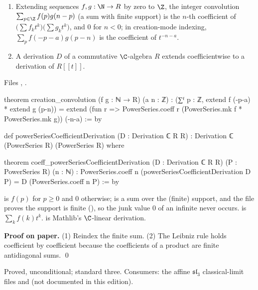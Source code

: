 \begin{theorem}\label{l11:thm:jetconv}
\begin{enumerate}
\item Extending sequences $f,g:\N\to R$ by zero to $\Z$, the integer convolution $\sum_{p\in\Z}f(p)g(n-p)$ (a sum with
  finite support) is the $n$-th coefficient of $\bigl(\sum f_kt^k\bigr)\bigl(\sum g_kt^k\bigr)$, and $0$ for $n<0$; in
  creation-mode indexing, $\sum_pf(-p-a)g(p-n)$ is the coefficient of $t^{-n-a}$.
\item A derivation $D$ of a commutative $\C$-algebra $R$ extends coefficientwise to a derivation of $R[[t]]$.
\end{enumerate}
\end{theorem}
\noindent Files ,
.
\begin{leancode}
theorem creation_convolution (f g : ℕ → R) (a n : ℤ) :
    (∑ᶠ p : ℤ, extend f (-p-a) * extend g (p-n)) =
      extend (fun r => PowerSeries.coeff r (PowerSeries.mk f * PowerSeries.mk g)) (-n-a) := by

def powerSeriesCoefficientDerivation (D : Derivation ℂ R R) :
    Derivation ℂ (PowerSeries R) (PowerSeries R) where

theorem coeff_powerSeriesCoefficientDerivation (D : Derivation ℂ R R)
    (P : PowerSeries R) (n : ℕ) :
    PowerSeries.coeff n (powerSeriesCoefficientDerivation D P) = D (PowerSeries.coeff n P) := by
\end{leancode}

\begin{dictionary}
 is $f(p)$ for $p\ge0$ and $0$ otherwise;  is a sum over the (finite) support, and the file
proves the support is finite (), so the junk value $0$ of an infinite  never
occurs.  is $\sum_kf(k)t^k$.  is Mathlib's $\C$-linear derivation.
\end{dictionary}

\textbf{Proof on paper.} (1) Reindex the finite sum. (2) The Leibniz rule holds coefficient by coefficient because
the coefficients of a product are finite antidiagonal sums. \qed

\begin{status}
Proved, unconditional; standard three. Consumers: the affine $\mathfrak{sl}_3$ classical-limit files 
and  (not documented in this edition).
\end{status}


